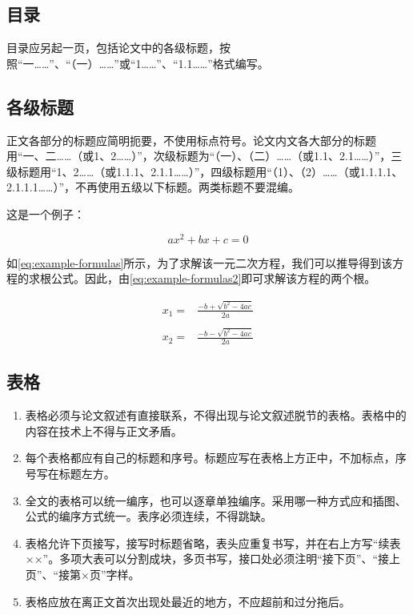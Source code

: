 \subsection{目录}

目录应另起一页，包括论文中的各级标题，按照``一……''、``（一）……''或``1……''、``1.1……''格式编写。

\subsection{各级标题}

正文各部分的标题应简明扼要，不使用标点符号。论文内文各大部分的标题用``一、二……（或1、2……）''，次级标题为``（一）、（二）……（或1.1、2.1……）''，三级标题用``1、2……（或1.1.1、2.1.1……）''，四级标题用``（1）、（2）……（或1.1.1.1、2.1.1.1……）''，不再使用五级以下标题。两类标题不要混编。


这是一个例子：

\begin{equation}
    \label{eq:example-formulas}
    ax^2 +bx+c = 0
\end{equation}


如\autoref{eq:example-formulas}所示，为了求解该一元二次方程，我们可以推导得到该方程的求根公式。因此，由\autoref{eq:example-formulas2}即可求解该方程的两个根。

\begin{equation}
    \label{eq:example-formulas2}
    \begin{split}
        x_1 = & \frac{-b+\sqrt{b^2-4ac}}{2a} \\
        & \\
        x_2 = & \frac{-b-\sqrt{b^2-4ac}}{2a}
    \end{split}
\end{equation}

\subsection{表格}

\begin{enumerate}
    \item 表格必须与论文叙述有直接联系，不得出现与论文叙述脱节的表格。表格中的内容在技术上不得与正文矛盾。
    \item 每个表格都应有自己的标题和序号。标题应写在表格上方正中，不加标点，序号写在标题左方。
    \item 全文的表格可以统一编序，也可以逐章单独编序。采用哪一种方式应和插图、公式的编序方式统一。表序必须连续，不得跳缺。
    \item 表格允许下页接写，接写时标题省略，表头应重复书写，并在右上方写``续表××''。多项大表可以分割成块，多页书写，接口处必须注明``接下页''、``接上页''、``接第×页''字样。
    \item 表格应放在离正文首次出现处最近的地方，不应超前和过分拖后。
\end{enumerate}


